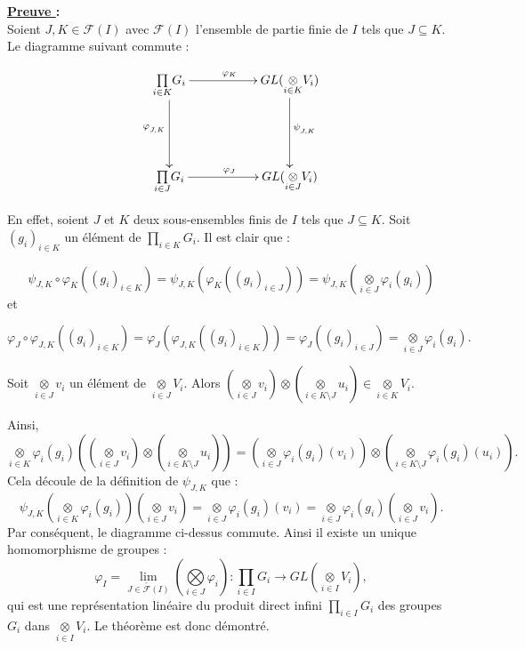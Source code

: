 \documentclass[9pt]{beamer}
\begin{document}
\begin{frame}
	\textbf{\underline{Preuve }  :}\\ 
Soient \( J , K \in \mathcal{F}(I) \) avec $\mathcal{F}(I)$ l'ensemble de partie finie de \( I \) tels que \( J \subseteq K \). Le diagramme suivant commute :

$$
\xymatrix{
	\underset{i\in K} \prod G_i \ar@{->}[rr]^{\varphi_{K}} \ar@{->}[dd]_{\varphi_{_{J,K}}} && GL(\underset{i\in K} \otimes V_i) \ar@{->}[dd]^{\psi_{_{J,K}}} \\
	&& \\
	\underset{i\in J} \prod G_i \ar@{->}[rr]^{\varphi_{J}} && GL(\underset{i\in J} \otimes V_i)
}
$$

En effet, soient \( J \) et \( K \) deux sous-ensembles finis de \( I \) tels que \( J \subseteq K \). Soit \( (g_i)_{i \in K} \) un élément de \( \underset{i\in K} \prod G_i \). Il est clair que :

$$
\psi_{J,K} \circ \varphi_{K} ((g_i)_{i\in K}) = \psi_{J, K}(\varphi_{K} ((g_i)_{i\in J})) = \psi_{J,K}(\underset{i\in J} \otimes \varphi_{i}(g_i))
$$
et

$$
\varphi_{J} \circ \varphi_{J,K} ((g_i)_{i\in K}) = \varphi_{J}(\varphi_{J,K}((g_i)_{i\in K})) = \varphi_{J} ((g_i)_{i\in J}) = \underset{i\in J} \otimes \varphi_{i}(g_i).
$$

Soit \( \underset{i\in J} \otimes v_i \) un élément de \( \underset{i\in J} \otimes V_i \). Alors \( (\underset{i\in J} \otimes v_i) \otimes (\underset{i\in K \setminus J} \otimes u_i) \in \underset{i\in K} \otimes V_i \). 
\end{frame}

\begin{frame}
	Ainsi,
	$$
	\underset{i\in K} \otimes \varphi_{i}(g_i) \left( (\underset{i\in J} \otimes v_i) \otimes (\underset{i\in K \setminus J} \otimes u_i) \right) = (\underset{i\in J} \otimes \varphi_{i}(g_i)(v_i)) \otimes (\underset{i\in K \setminus J} \otimes \varphi_{i}(g_i)(u_i)).
	$$
	Cela découle de la définition de \( \psi_{J,K} \) que :
	$$
	\psi_{J,K}(\underset{i\in K} \otimes \varphi_{i}(g_i))(\underset{i\in J} \otimes v_{i}) = \underset{i\in J} \otimes \varphi_{i}(g_i)(v_i) = \underset{i\in J} \otimes \varphi_{i}(g_i)(\underset{i\in J} \otimes v_i).
	$$
	Par conséquent, le diagramme ci-dessus commute. Ainsi il existe un unique homomorphisme de groupes :
	$$
	\varphi_I = 	\underset{\overleftarrow{J \in \mathcal{F}(I)}}{\lim} ( \underset{i \in J}{\bigotimes} \varphi_i) : \underset{i\in I} \prod G_i \longrightarrow GL(\underset{i\in I} \otimes V_i),
	$$
	qui est une représentation linéaire du produit direct infini \( \underset{i\in I} \prod G_i \) des groupes \( G_i \) dans \( \underset{i\in I} \otimes V_i \). Le théorème est donc démontré.
\end{frame}
\end{document}
